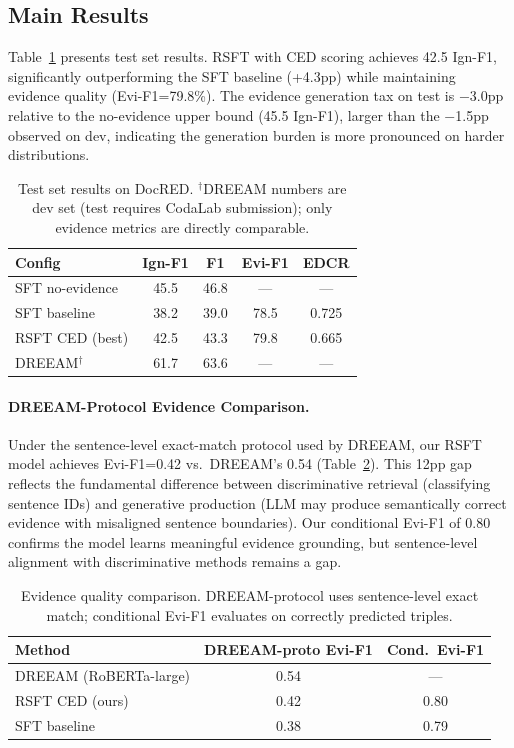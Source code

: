\documentclass[11pt,a4paper]{article}
\begin{document}
\subsection{Main Results}

Table~\ref{tab:main} presents test set results. RSFT with CED scoring achieves 42.5 Ign-F1, significantly outperforming the SFT baseline (+4.3pp) while maintaining evidence quality (Evi-F1=79.8\%). The evidence generation tax on test is $-$3.0pp relative to the no-evidence upper bound (45.5 Ign-F1), larger than the $-$1.5pp observed on dev, indicating the generation burden is more pronounced on harder distributions.

\begin{table}[t]
\centering
\small
\begin{tabular}{lcccc}
\toprule
\textbf{Config} & \textbf{Ign-F1} & \textbf{F1} & \textbf{Evi-F1} & \textbf{EDCR} \\
\midrule
SFT no-evidence & 45.5 & 46.8 & --- & --- \\
SFT baseline & 38.2 & 39.0 & 78.5 & 0.725 \\
RSFT CED (best) & 42.5 & 43.3 & 79.8 & 0.665 \\
\midrule
DREEAM$^\dagger$ & 61.7 & 63.6 & --- & --- \\
\bottomrule
\end{tabular}
\caption{Test set results on DocRED. $^\dagger$DREEAM numbers are dev set (test requires CodaLab submission); only evidence metrics are directly comparable.}
\label{tab:main}
\end{table}

\paragraph{DREEAM-Protocol Evidence Comparison.} Under the sentence-level exact-match protocol used by DREEAM, our RSFT model achieves Evi-F1=0.42 vs.\ DREEAM's 0.54 (Table~\ref{tab:evi_comparison}). This 12pp gap reflects the fundamental difference between discriminative retrieval (classifying sentence IDs) and generative production (LLM may produce semantically correct evidence with misaligned sentence boundaries). Our conditional Evi-F1 of 0.80 confirms the model learns meaningful evidence grounding, but sentence-level alignment with discriminative methods remains a gap.

\begin{table}[t]
\centering
\small
\begin{tabular}{lcc}
\toprule
\textbf{Method} & \textbf{DREEAM-proto Evi-F1} & \textbf{Cond.\ Evi-F1} \\
\midrule
DREEAM (RoBERTa-large) & 0.54 & --- \\
RSFT CED (ours) & 0.42 & 0.80 \\
SFT baseline & 0.38 & 0.79 \\
\bottomrule
\end{tabular}
\caption{Evidence quality comparison. DREEAM-protocol uses sentence-level exact match; conditional Evi-F1 evaluates on correctly predicted triples.}
\label{tab:evi_comparison}
\end{table}
\end{document}
